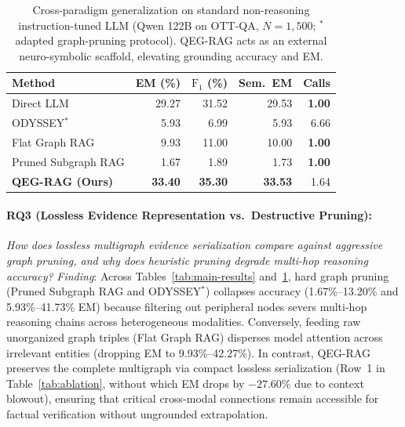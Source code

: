 \documentclass[runningheads]{llncs}
\begin{document}
\begin{table}[t]
\caption{Cross-paradigm generalization on standard non-reasoning instruction-tuned LLM (Qwen 122B on OTT-QA, $N=1{,}500$; $^*$adapted graph-pruning protocol). QEG-RAG acts as an external neuro-symbolic scaffold, elevating grounding accuracy and EM.}
\label{tab:qwen-results}
\vspace{1.0mm}
\centering
\scriptsize
\renewcommand{\arraystretch}{0.88}
\setlength{\tabcolsep}{7pt}
\begin{tabular}{@{}lrrrr@{}}
\toprule
Method & EM (\%) & $\text{F}_1$ (\%) & Sem.\ EM & Calls \\
\midrule
Direct LLM                         & 29.27 & 31.52 & 29.53 & \textbf{1.00} \\
ODYSSEY$^*$~\cite{agarwal2025hybrid} & 5.93  & 6.99  & 5.93  & 6.66 \\
Flat Graph RAG                     & 9.93  & 11.00 & 10.00 & \textbf{1.00} \\
Pruned Subgraph RAG                  & 1.67  & 1.89  & 1.73  & \textbf{1.00} \\
\textbf{QEG-RAG (Ours)}            & \textbf{33.40} & \textbf{35.30} & \textbf{33.53} & 1.64 \\
\bottomrule
\end{tabular}
\vspace{1.0mm}
\end{table}

\enlargethispage{2.5\baselineskip}
\paragraph{RQ3 (Lossless Evidence Representation vs.\ Destructive Pruning):}
\emph{How does lossless multigraph evidence serialization compare against aggressive graph pruning, and why does heuristic pruning degrade multi-hop reasoning accuracy?}
\emph{Finding}: Across Tables~\ref{tab:main-results} and~\ref{tab:qwen-results}, hard graph pruning (Pruned Subgraph RAG and ODYSSEY$^*$) collapses accuracy (1.67\%--13.20\% and 5.93\%--41.73\% EM) because filtering out peripheral nodes severs multi-hop reasoning chains across heterogeneous modalities. Conversely, feeding raw unorganized graph triples (Flat Graph RAG) disperses model attention across irrelevant entities (dropping EM to 9.93\%--42.27\%). In contrast, QEG-RAG preserves the complete multigraph via compact lossless serialization (Row~1 in Table~\ref{tab:ablation}, without which EM drops by $-27.60\%$ due to context blowout), ensuring that critical cross-modal connections remain accessible for factual verification without ungrounded extrapolation.
\end{document}
